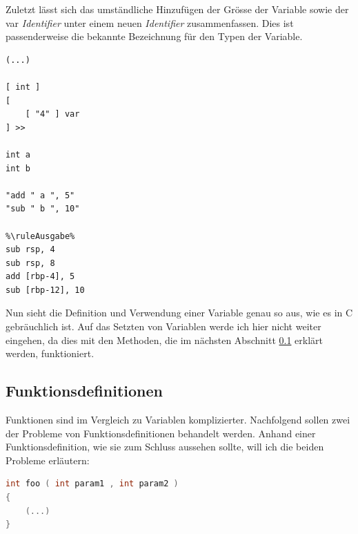 Zuletzt lässt sich das umständliche Hinzufügen der Grösse der Variable sowie der {\selectListingFont var} \textit{Identifier} unter einem neuen \textit{Identifier} zusammenfassen.
Dies ist passenderweise die bekannte Bezeichnung für den Typen der Variable.

\begin{lstlisting}[language=QHS, caption=Definition einer Variable mit {\selectListingFont int} \textit{Identifier}]
%\ruleEingabe%
(...)

[ int ] 
[
    [ "4" ] var
] >>
    
int a 
int b 
    
"add " a ", 5"
"sub " b ", 10"
        
%\ruleAusgabe%
sub rsp, 4
sub rsp, 8
add [rbp-4], 5
sub [rbp-12], 10
\end{lstlisting}

Nun sieht die Definition und Verwendung einer Variable genau so aus, wie es in C gebräuchlich ist.
Auf das Setzten von Variablen werde ich hier nicht weiter eingehen, da dies mit den Methoden, die im nächsten Abschnitt \ref{sec:qhs-funcs} erklärt werden, funktioniert.

\subsection{Funktionsdefinitionen} \label{sec:qhs-funcs}
Funktionen sind im Vergleich zu Variablen komplizierter. Nachfolgend sollen zwei der Probleme von Funktionsdefinitionen behandelt werden.
Anhand einer Funktionsdefinition, wie sie zum Schluss aussehen sollte, will ich die beiden Probleme erläutern:

\begin{lstlisting}[language=C, label=eg:qhs-function_goal, caption=Ziel für die Definition einer Funktion in QHS]
int foo ( int param1 , int param2 )
{
    (...)
}
\end{lstlisting}

